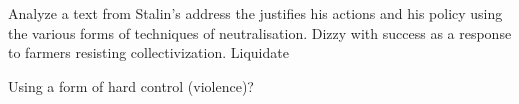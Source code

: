 \documentclass[11pt, a4paper,]{scrartcl}
\begin{document}
Analyze a text from Stalin's address the justifies his actions and his policy using the various forms of  techniques of neutralisation. Dizzy with success as a response to farmers resisting collectivization. Liquidate\par

Using a form of hard control (violence)? \par










\newpage



\end{document}
